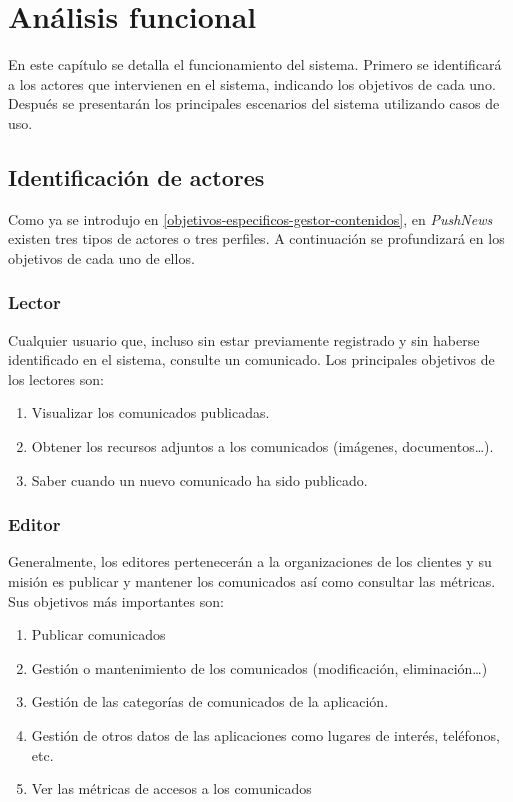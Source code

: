 \chapter{Análisis funcional}
En este capítulo se detalla el funcionamiento del sistema. Primero se identificará a los actores que intervienen en el sistema, indicando los objetivos de cada uno. Después se presentarán los principales escenarios del sistema utilizando casos de uso.

\section{Identificación de actores}
Como ya se introdujo en \ref{objetivos-especificos-gestor-contenidos}, en \emph{PushNews} existen tres tipos de actores o tres perfiles. A continuación se profundizará en los objetivos de cada uno de ellos.

\subsection{Lector}
Cualquier usuario que, incluso sin estar previamente registrado y sin haberse identificado en el sistema, consulte un comunicado. Los principales objetivos de los lectores son:
\begin{enumerate}
    \item Visualizar los comunicados publicadas.
    \item Obtener los recursos adjuntos a los comunicados (imágenes, documentos\dots).
    \item Saber cuando un nuevo comunicado ha sido publicado.
\end{enumerate}

\subsection{Editor}
Generalmente, los editores pertenecerán a la organizaciones de los clientes y su misión es publicar y mantener los comunicados así como consultar las métricas. Sus objetivos más importantes son:
\begin{enumerate}
    \item Publicar comunicados
    \item Gestión o mantenimiento de los comunicados (modificación, eliminación\dots)
    \item Gestión de las categorías de comunicados de la aplicación.
    \item Gestión de otros datos de las aplicaciones como lugares de interés, teléfonos, etc.
    \item Ver las métricas de accesos a los comunicados
\end{enumerate}

